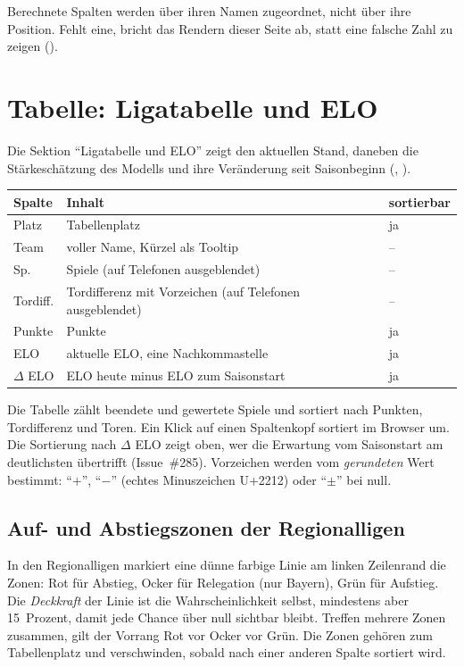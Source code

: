 Berechnete Spalten werden über ihren Namen zugeordnet, nicht über ihre
Position. Fehlt eine, bricht das Rendern dieser Seite ab, statt eine falsche
Zahl zu zeigen ().

\section{Tabelle: Ligatabelle und ELO}

Die Sektion \enquote{Ligatabelle und ELO} zeigt den aktuellen Stand, daneben
die Stärkeschätzung des Modells und ihre Veränderung seit Saisonbeginn
(, ).

\begin{center}
\small
\begin{tabular}{@{}lll@{}}
\toprule
Spalte & Inhalt & sortierbar \\
\midrule
Platz    & Tabellenplatz & ja \\
Team     & voller Name, Kürzel als Tooltip & -- \\
Sp.      & Spiele (auf Telefonen ausgeblendet) & -- \\
Tordiff. & Tordifferenz mit Vorzeichen (auf Telefonen ausgeblendet) & -- \\
Punkte   & Punkte & ja \\
ELO      & aktuelle ELO, eine Nachkommastelle & ja \\
$\Delta$ ELO & ELO heute minus ELO zum Saisonstart & ja \\
\bottomrule
\end{tabular}
\end{center}

Die Tabelle zählt beendete und gewertete Spiele und sortiert nach Punkten,
Tordifferenz und Toren. Ein Klick auf einen Spaltenkopf sortiert im Browser
um. Die Sortierung nach $\Delta$ ELO zeigt oben, wer die Erwartung vom
Saisonstart am deutlichsten übertrifft (Issue~\#285). Vorzeichen werden vom
\emph{gerundeten} Wert bestimmt: \enquote{$+$}, \enquote{$-$} (echtes
Minuszeichen U+2212) oder \enquote{$\pm$} bei null.

\subsection*{Auf- und Abstiegszonen der Regionalligen}

In den Regionalligen markiert eine dünne farbige Linie am linken Zeilenrand
die Zonen: \textcolor{akzent}{Rot} für Abstieg, \textcolor{ocker}{Ocker} für
Relegation (nur Bayern), \textcolor{gruen}{Grün} für Aufstieg. Die
\emph{Deckkraft} der Linie ist die Wahrscheinlichkeit selbst, mindestens aber
15~Prozent, damit jede Chance über null sichtbar bleibt. Treffen mehrere
Zonen zusammen, gilt der Vorrang Rot vor Ocker vor Grün. Die Zonen gehören
zum Tabellenplatz und verschwinden, sobald nach einer anderen Spalte sortiert
wird.

